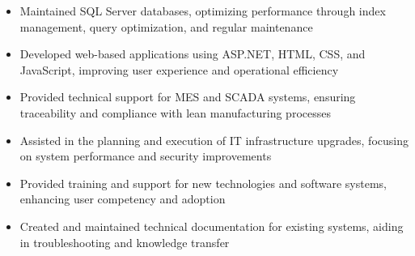 \par\smallskip
\noindent
\begin{minipage}{20cm}
  \begin{minipage}{9.75cm}
    \begin{itemize}
      \item Maintained SQL Server databases, optimizing performance through index management, query optimization, and regular maintenance
      \item Developed web-based applications using ASP.NET, HTML, CSS, and JavaScript, improving user experience and operational efficiency
      \item Provided technical support for MES and SCADA systems, ensuring traceability and compliance with lean manufacturing processes
    \end{itemize}
  \end{minipage}
  \hfill
  \begin{minipage}{9.75cm}
    \begin{itemize}
      \item Assisted in the planning and execution of IT infrastructure upgrades, focusing on system performance and security improvements
      \item Provided training and support for new technologies and software systems, enhancing user competency and adoption
      \item Created and maintained technical documentation for existing systems, aiding in troubleshooting and knowledge transfer
    \end{itemize}
  \end{minipage}
\end{minipage}
\par\smallskip
\divider

